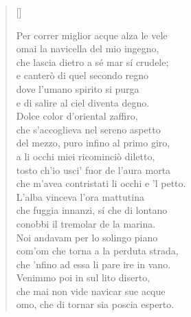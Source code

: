 \documentclass{article}
\begin{document}
\begin{verse}[\versewidth]
  \begin{patverse*}
    Per correr miglior acque alza le vele\\
    omai la navicella del mio ingegno,\\
    che lascia dietro a sé mar sí crudele;\\
    e canterò di quel secondo regno\\
    dove l'umano spirito si purga\\
    e di salire al ciel diventa degno.\\
    Dolce color d'oriental zaffiro,\\
    che s'accoglieva nel sereno aspetto\\
    del mezzo, puro infino al primo giro,\\
    a li occhi miei ricominciò diletto,\\
    tosto ch'io usci' fuor de l'aura morta\\
    che m'avea contristati li occhi e 'l petto.\\
    L'alba vinceva l'ora mattutina\\
    che fuggia innanzi, sí che di lontano\\
    conobbi il tremolar de la marina.\\
    Noi andavam per lo solingo piano\\
    com'om che torna a la perduta strada,\\
    che 'nfino ad essa li pare ire in vano.\\
    Venimmo poi in sul lito diserto,\\
    che mai non vide navicar sue acque\\
    omo, che di tornar sia poscia esperto.\\
  \end{patverse*}
\end{verse}
\end{document}
